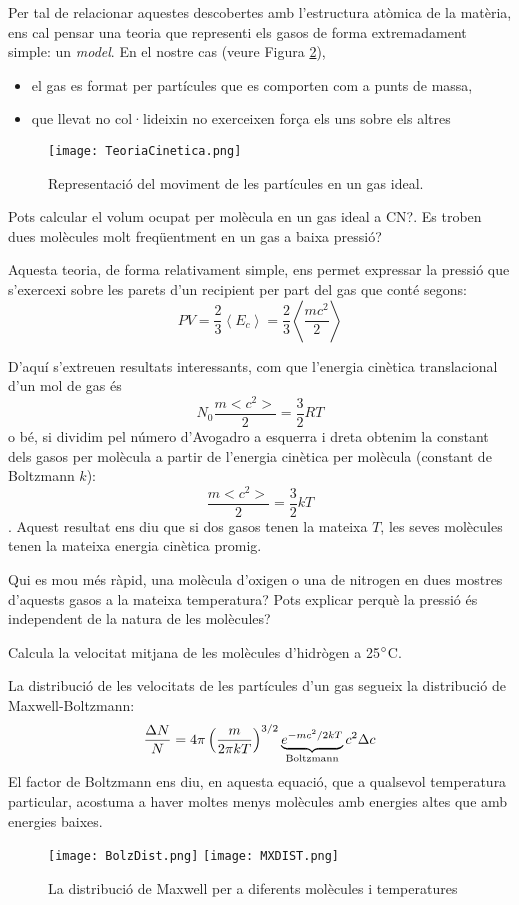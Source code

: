Per tal de relacionar aquestes descobertes amb l'estructura atòmica de la matèria, ens cal pensar una teoria que representi els gasos de forma extremadament simple: un \textit{model}. En el nostre cas (veure Figura \ref{fig:TeoriaCinetica}),
\begin{itemize}
\item el gas es format per partícules que es comporten com a punts de massa,
\item que llevat no col·lideixin no exerceixen força els uns sobre els altres
\end{itemize}
\begin{figure}[h]
\centering
\texttt{[image: TeoriaCinetica.png]}
\caption{Representació del moviment de les partícules en un gas ideal.}
\label{fig:TeoriaCinetica}
\end{figure}
\begin{exr}
Pots calcular el volum ocupat per molècula en un gas ideal a CN?. Es troben dues molècules molt freqüentment en un gas a baixa pressió?
\end{exr}
Aquesta teoria, de forma relativament simple, ens permet expressar la pressió que s'exercexi sobre les parets d'un recipient per part del gas que conté segons:
\[
PV=\frac{2}{3} \left< E_c \right> = \frac{2}{3} \left< \frac{mc^2}{2} \right>
\]

D'aquí s'extreuen resultats interessants, com que l'energia cinètica translacional d'un mol de gas és \[N_0 \frac{m <c^2>}{2}=\frac{3}{2} RT\] o bé, si dividim pel número d'Avogadro a esquerra i dreta obtenim la constant dels gasos per molècula a partir de l'energia cinètica per molècula (constant de Boltzmann $k$): \[\frac{m <c^2>}{2}=\frac{3}{2} kT\].
Aquest resultat ens diu que si dos gasos tenen la mateixa $T$, les seves molècules tenen la mateixa energia cinètica promig. 
\begin{exr}
Qui es mou més ràpid, una molècula d'oxigen o una de nitrogen en dues mostres d'aquests gasos a la mateixa temperatura? Pots explicar perquè la pressió és independent de la natura de les molècules?
\end{exr}

\begin{exr}
Calcula la velocitat mitjana de les molècules d'hidrògen a 25$\degree$C.
\end{exr}

La distribució de les velocitats de les partícules d'un gas segueix la distribució de Maxwell-Boltzmann:
\[
\frac{\Delta N}{N}=4 \pi \left( \frac{m}{2 \pi kT}\right)^{3/2} \underbrace{e^{-mc^2/2kT}}_{\rm Boltzmann} c^2 \Delta c
\]
El factor de Boltzmann ens diu, en aquesta equació, que a qualsevol temperatura particular, acostuma a haver moltes menys molècules amb energies altes que amb energies baixes.
\begin{figure}[h]
\centering
\texttt{[image: BolzDist.png]}
\texttt{[image: MXDIST.png]}
\caption{La distribució de Maxwell per a diferents molècules i temperatures}
\label{fig:TeoriaCinetica}
\end{figure}

